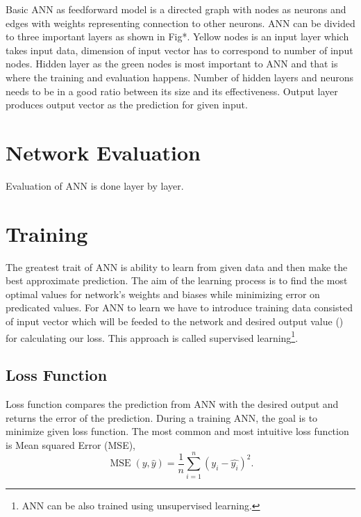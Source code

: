 
Basic ANN as feedforward model is a directed graph with nodes as neurons and edges with weights representing connection to other neurons.
ANN can be divided to three important layers as shown in Fig*.
Yellow nodes is an input layer which takes input data, dimension of input vector has to correspond to number of input nodes.
Hidden layer as the green nodes is most important to ANN and that is where the training and evaluation happens.
Number of hidden layers and neurons needs to be in a good ratio between its size and its effectiveness.
Output layer produces output vector as the prediction for given input.


\section{Network Evaluation}

Evaluation of ANN is done layer by layer.


\section{Training}

The greatest trait of ANN is ability to learn from given data and then make the best approximate prediction.
The aim of the learning process is to find the most optimal values for network's weights and biases while minimizing error on predicated values.
For ANN to learn we have to introduce training data consisted of input vector which will be feeded to the network and desired output value () for calculating our loss.
This approach is called supervised learning\footnote{\label{note1}ANN can be also trained using unsupervised learning.}.
\newline

\subsection{Loss Function}

Loss function compares the prediction from ANN with the desired output and returns the error of the prediction.
During a training ANN, the goal is to minimize given loss function.
The most common and most intuitive loss function is Mean squared Error (MSE),
\[ \operatorname{MSE}(y, \hat{y}) = \frac{1}{n}\sum_{i=1}^n(y_i-\hat{y_i})^2. \]


